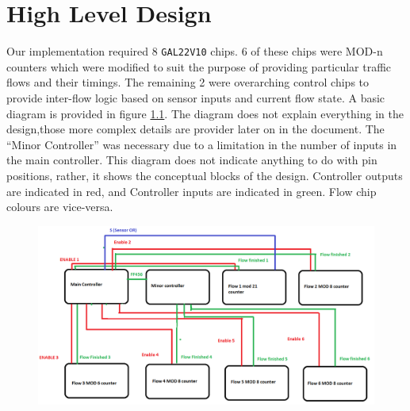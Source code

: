 \chapter{High Level Design}
Our implementation required 8 \texttt{GAL22V10} chips. 6 of these chips were
MOD-n counters which were modified to suit the purpose of providing particular
traffic flows and their timings. The remaining 2 were overarching control chips
to provide inter-flow logic based on sensor inputs and current flow state. A
basic diagram is provided in figure \ref{fig:overall-design}. The diagram does
not explain everything in the design,those more complex details are provider
later on in the document. The ``Minor Controller'' was necessary due to a
limitation in the number of inputs in the main controller. This diagram does not
indicate anything to do with pin positions, rather, it shows the conceptual
blocks of the design. Controller outputs are indicated in red, and Controller
inputs are indicated in green. Flow chip colours are vice-versa.  

\begin{figure}
\includegraphics[width=\linewidth]{img/LJNpzV.png}
\label{fig:overall-design}
\end{figure}